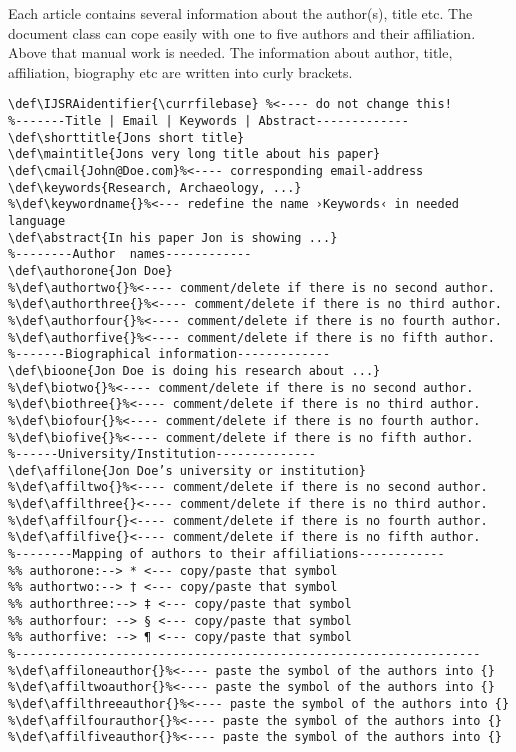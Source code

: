 \documentclass[
	]{ijsra}
\makeatletter
\def\IJSRAidentifier{\currfilebase}
\def\authorone{Lukas C. Bossert}
\def\bioone{The coding of this documentclass is done at \href{https://github.com/LukasCBossert/documentclass-ijsra}{https://github.com/LukasCBossert/documentclass-ijsra} }
\def\maintitle{The \texttt{ijsra}-class, Version \IJSRAversion\ -- \IJSRAversiondate}
\def\shorttitle{\maintitle}
\def\abstract{This is a documentation of the class \texttt{ijsra} which is used for the
 \emph{International Journal of Student Research in Archaeology}.
 Read this documentation carefully.
 When you start editing do it according to the structure shown in \cref{document}.}
\def\affilone{Humboldt-Universität zu Berlin | Excellence-Cluster Topoi}
\def\cmail{lukas@digitales-altertum.de}
\def\keywords{documentclass, \LaTeX , IJSRA}
\makeatother
\begin{document}
\IJSRAseparator
Each article contains several information about the author(s), title etc. 
The document class can cope easily with one to five authors and their affiliation. 
Above that manual work is needed.
The information about author, title, affiliation, biography etc are written into curly brackets.
\begin{lstlisting}[label=information,caption={Information about the article}]
\def\IJSRAidentifier{\currfilebase} %<---- do not change this!
%-------Title | Email | Keywords | Abstract-------------
\def\shorttitle{Jons short title}
\def\maintitle{Jons very long title about his paper}
\def\cmail{John@Doe.com}%<---- corresponding email-address
\def\keywords{Research, Archaeology, ...}
%\def\keywordname{}%<--- redefine the name ›Keywords‹ in needed language
\def\abstract{In his paper Jon is showing ...}
%--------Author  names------------
\def\authorone{Jon Doe}
%\def\authortwo{}%<---- comment/delete if there is no second author.
%\def\authorthree{}%<---- comment/delete if there is no third author.
%\def\authorfour{}%<---- comment/delete if there is no fourth author.
%\def\authorfive{}%<---- comment/delete if there is no fifth author.
%-------Biographical information-------------
\def\bioone{Jon Doe is doing his research about ...}
%\def\biotwo{}%<---- comment/delete if there is no second author.
%\def\biothree{}%<---- comment/delete if there is no third author.
%\def\biofour{}%<---- comment/delete if there is no fourth author.
%\def\biofive{}%<---- comment/delete if there is no fifth author.
%------University/Institution--------------
\def\affilone{Jon Doe’s university or institution}
%\def\affiltwo{}%<---- comment/delete if there is no second author.
%\def\affilthree{}<---- comment/delete if there is no third author.
%\def\affilfour{}<---- comment/delete if there is no fourth author.
%\def\affilfive{}<---- comment/delete if there is no fifth author.
%--------Mapping of authors to their affiliations------------
%% authorone:--> * <--- copy/paste that symbol
%% authortwo:--> † <--- copy/paste that symbol
%% authorthree:--> ‡ <--- copy/paste that symbol
%% authorfour: --> § <--- copy/paste that symbol
%% authorfive: --> ¶ <--- copy/paste that symbol
%-----------------------------------------------------------------
%\def\affiloneauthor{}%<---- paste the symbol of the authors into {}
%\def\affiltwoauthor{}%<---- paste the symbol of the authors into {}
%\def\affilthreeauthor{}%<---- paste the symbol of the authors into {}
%\def\affilfourauthor{}%<---- paste the symbol of the authors into {}
%\def\affilfiveauthor{}%<---- paste the symbol of the authors into {}
\end{lstlisting}
\end{document}
